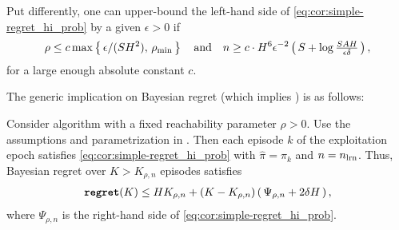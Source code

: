 \begin{remark}
Put differently, one can upper-bound the left-hand side of \eqref{eq:cor:simple-regret_hi_prob} by a given $\epsilon>0$ if
\begin{align}
\rho \le c\max\left\{\,\epsilon/(SH^2),\,\rho_{\min}\,\right\}
    \quad \text{and}\quad
n \ge c\cdot H^6\epsilon^{-2} \left(\,S+\log \tfrac{SAH}{\epsilon\delta}\,\right),
\end{align}
for a large enough absolute constant $c$.
\end{remark}


The generic implication on Bayesian regret (which implies ) is as follows:

\begin{corollary}\label{cor:regret}
Consider algorithm \HHandExploit with a fixed reachability parameter $\rho>0$. Use the assumptions and parametrization in . Then each episode $k$ of the exploitation epoch satisfies \eqref{eq:cor:simple-regret_hi_prob} with $\hat{\pi} = \pi_k$ and $n=n_{\mathrm{lrn}}$. Thus, Bayesian regret over $K>K_{\rho,n}$ episodes satisfies
 \begin{align}\label{eq:cor:regret}
{\normalfont \texttt{\textbf{regret}}}(K) \leq H K_{\rho,n} + (K-K_{\rho,n}) \left(\,\Psi_{\rho,n}+ 2\delta H\,\right),
\end{align}
where $\Psi_{\rho,n}$ is the right-hand side of \eqref{eq:cor:simple-regret_hi_prob}.
\end{corollary}





